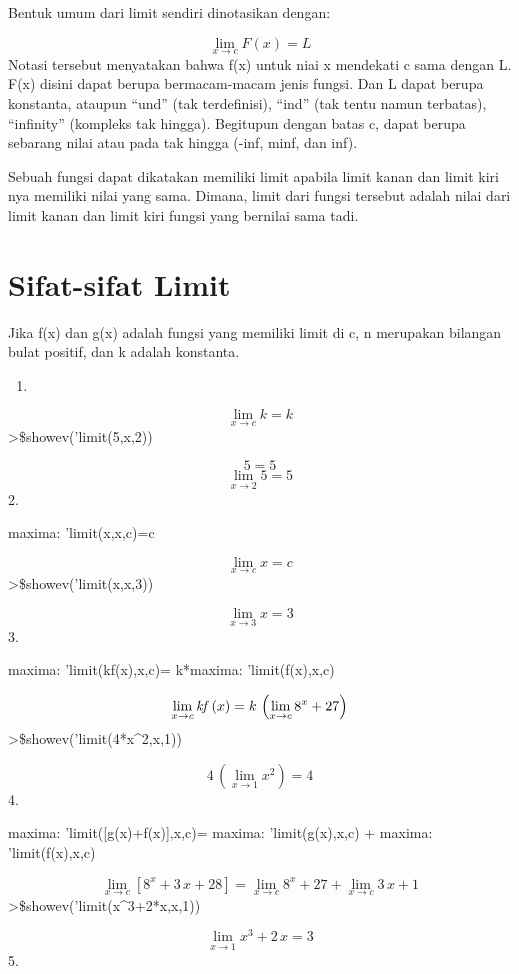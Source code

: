 \documentclass[
]{book}
\providecommand{\tightlist}{%
  \setlength{\itemsep}{0pt}\setlength{\parskip}{0pt}}
\begin{document}
Bentuk umum dari limit sendiri dinotasikan dengan:

\[\lim_{x\rightarrow c}{F\left(x\right)}=L\]Notasi tersebut menyatakan bahwa f(x) untuk niai x mendekati c sama dengan L. F(x) disini dapat berupa bermacam-macam jenis fungsi. Dan L dapat berupa konstanta, ataupun ``und'' (tak terdefinisi), ``ind'' (tak tentu namun terbatas), ``infinity'' (kompleks tak hingga). Begitupun dengan batas c, dapat berupa sebarang nilai atau pada tak hingga (-inf, minf, dan inf).

Sebuah fungsi dapat dikatakan memiliki limit apabila limit kanan dan limit kiri nya memiliki nilai yang sama. Dimana, limit dari fungsi tersebut adalah nilai dari limit kanan dan limit kiri fungsi yang bernilai sama tadi.

\section{Sifat-sifat Limit}\label{sifat-sifat-limit}

Jika f(x) dan g(x) adalah fungsi yang memiliki limit di c, n merupakan bilangan bulat positif, dan k adalah konstanta.

\begin{enumerate}
\def\labelenumi{\arabic{enumi}.}
\tightlist
\item
\end{enumerate}

\[\lim_{x \to c}k=k\]\textgreater\$showev('limit(5,x,2))

\[5=5\]\[\lim_{x \to 2}5=5\]2.

maxima: 'limit(x,x,c)=c

\[\lim_{x\rightarrow c}{x}=c\]\textgreater\$showev('limit(x,x,3))

\[\lim_{x\rightarrow 3}{x}=3\]3.

maxima: 'limit(kf(x),x,c)= k*maxima: 'limit(f(x),x,c)

\[\lim_{x\rightarrow c}{{\it kf}\left(x\right)}=k\,\left(\lim_{x  \rightarrow c}{8^{x}+27}\right)\]\textgreater\$showev('limit(4*x\^{}2,x,1))

\[4\,\left(\lim_{x\rightarrow 1}{x^2}\right)=4\]4.

maxima: 'limit({[}g(x)+f(x){]},x,c)= maxima: 'limit(g(x),x,c) + maxima: 'limit(f(x),x,c)

\[\lim_{x\rightarrow c}{\left[ 8^{x}+3\,x+28 \right] }=\lim_{x  \rightarrow c}{8^{x}+27}+\lim_{x\rightarrow c}{3\,x+1}\]\textgreater\$showev('limit(x\^{}3+2*x,x,1))

\[\lim_{x\rightarrow 1}{x^3+2\,x}=3\]5.
\end{document}

